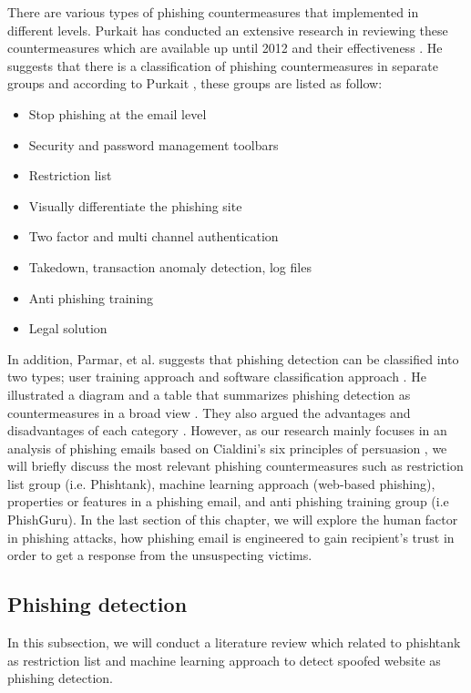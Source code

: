 There are various types of phishing countermeasures that implemented
in different levels. Purkait has conducted an extensive research in
reviewing these countermeasures which are available up until 2012
and their effectiveness \citep{purkait}. He suggests that there is
a classification of phishing countermeasures in separate groups and
according to Purkait \citep{purkait}, these groups are listed as
follow:
\begin{itemize}
\item Stop phishing at the email level
\item Security and password management toolbars
\item Restriction list
\item Visually differentiate the phishing site
\item Two factor and multi channel authentication
\item Takedown, transaction anomaly detection, log files
\item Anti phishing training
\item Legal solution
\end{itemize}
In addition, Parmar, et al. suggests that phishing detection can be
classified into two types; user training approach and software classification
approach \citep{parmar:2014}. He illustrated a diagram and a table
that summarizes phishing detection as countermeasures in a broad view
\citep{parmar:2014}. They also argued the advantages and disadvantages
of each category \citep{parmar:2014}. However, as our research mainly
focuses in an analysis of phishing emails based on Cialdini's six
principles of persuasion \citep{cialdini:2001}, we will briefly discuss
the most relevant phishing countermeasures such as restriction list
group (i.e. Phishtank), machine learning approach (web-based phishing),
properties or features in a phishing email, and anti phishing training
group (i.e PhishGuru). In the last section of this chapter, we will
explore the human factor in phishing attacks, how phishing email is
engineered to gain recipient's trust in order to get a response from
the unsuspecting victims.


\subsection{Phishing detection}

In this subsection, we will conduct a literature review which related
to phishtank as restriction list and machine learning approach to
detect spoofed website as phishing detection.


